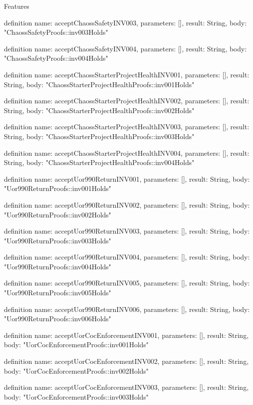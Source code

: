 \begin{lexlean}{Features}
\begin{semanticmodule}
definition{
  name: acceptChaossSafetyINV003,
  parameters: [],
  result: String,
  body: "ChaossSafetyProofs::inv003Holds"
}

definition{
  name: acceptChaossSafetyINV004,
  parameters: [],
  result: String,
  body: "ChaossSafetyProofs::inv004Holds"
}

definition{
  name: acceptChaossStarterProjectHealthINV001,
  parameters: [],
  result: String,
  body: "ChaossStarterProjectHealthProofs::inv001Holds"
}

definition{
  name: acceptChaossStarterProjectHealthINV002,
  parameters: [],
  result: String,
  body: "ChaossStarterProjectHealthProofs::inv002Holds"
}

definition{
  name: acceptChaossStarterProjectHealthINV003,
  parameters: [],
  result: String,
  body: "ChaossStarterProjectHealthProofs::inv003Holds"
}

definition{
  name: acceptChaossStarterProjectHealthINV004,
  parameters: [],
  result: String,
  body: "ChaossStarterProjectHealthProofs::inv004Holds"
}

definition{
  name: acceptUor990ReturnINV001,
  parameters: [],
  result: String,
  body: "Uor990ReturnProofs::inv001Holds"
}

definition{
  name: acceptUor990ReturnINV002,
  parameters: [],
  result: String,
  body: "Uor990ReturnProofs::inv002Holds"
}

definition{
  name: acceptUor990ReturnINV003,
  parameters: [],
  result: String,
  body: "Uor990ReturnProofs::inv003Holds"
}

definition{
  name: acceptUor990ReturnINV004,
  parameters: [],
  result: String,
  body: "Uor990ReturnProofs::inv004Holds"
}

definition{
  name: acceptUor990ReturnINV005,
  parameters: [],
  result: String,
  body: "Uor990ReturnProofs::inv005Holds"
}

definition{
  name: acceptUor990ReturnINV006,
  parameters: [],
  result: String,
  body: "Uor990ReturnProofs::inv006Holds"
}

definition{
  name: acceptUorCocEnforcementINV001,
  parameters: [],
  result: String,
  body: "UorCocEnforcementProofs::inv001Holds"
}

definition{
  name: acceptUorCocEnforcementINV002,
  parameters: [],
  result: String,
  body: "UorCocEnforcementProofs::inv002Holds"
}

definition{
  name: acceptUorCocEnforcementINV003,
  parameters: [],
  result: String,
  body: "UorCocEnforcementProofs::inv003Holds"
}


\end{semanticmodule}
\end{lexlean}
